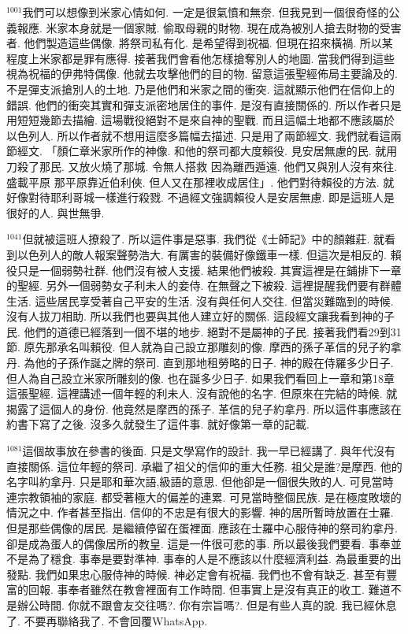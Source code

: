 \documentclass{book}
\begin{document}
$^{1001}$我們可以想像到米家心情如何.
一定是很氣憤和無奈.
但我見到一個很奇怪的公義報應.
米家本身就是一個家賊.
偷取母親的財物.
現在成為被別人搶去財物的受害者.
他們製造這些偶像.
將祭司私有化.
是希望得到祝福.
但現在招來橫禍.
所以某程度上米家都是罪有應得.
接著我們會看他怎樣搶奪別人的地圖.
當我們得到這些視為祝福的伊弗特偶像.
他就去攻擊他們的目的物.
留意這張聖經佈局主要論及的.
不是彈支派搶別人的土地.
乃是他們和米家之間的衝突.
這就顯示他們在信仰上的錯誤.
他們的衝突其實和彈支派密地居住的事件.
是沒有直接關係的.
所以作者只是用短短幾節去描繪.
這場戰役絕對不是來自神的聖戰.
而且這幅土地都不應該屬於以色列人.
所以作者就不想用這麼多篇幅去描述.
只是用了兩節經文.
我們就看這兩節經文.
「顏仁章米家所作的神像.
和他的祭司都大度賴役.
見安居無慮的民.
就用刀殺了那民.
又放火燒了那城.
令無人搭救 因為離西遁遠.
他們又與別人沒有來往.
盛載平原 那平原靠近伯利俠.
但人又在那裡收成居住」.
他們對待賴役的方法.
就好像對待耶利哥城一樣進行殺戮.
不過經文強調賴役人是安居無慮.
即是這班人是很好的人.
與世無爭.

$^{1041}$但就被這班人撩殺了.
所以這件事是惡事.
我們從《士師記》中的顏雜莊.
就看到以色列人的敵人報案聲勢浩大.
有厲害的裝備好像鐵車一樣.
但這次是相反的.
賴役只是一個弱勢社群.
他們沒有被人支援.
結果他們被殺.
其實這裡是在鋪排下一章的聖經.
另外一個弱勢女子利未人的妾侍.
在無聲之下被殺.
這裡提醒我們要有群體生活.
這些居民享受著自己平安的生活.
沒有與任何人交往.
但當災難臨到的時候.
沒有人拔刀相助.
所以我們也要與其他人建立好的關係.
這段經文讓我看到神的子民.
他們的道德已經落到一個不堪的地步.
絕對不是屬神的子民.
接著我們看29到31節.
原先那承名叫賴役.
但人就為自己設立那雕刻的像.
摩西的孫子革信的兒子約拿丹.
為他的子孫作誕之牌的祭司.
直到那地租勞略的日子.
神的殿在侍羅多少日子.
但人為自己設立米家所雕刻的像.
也在誕多少日子.
如果我們看回上一章和第18章這張聖經.
這裡講述一個年輕的利未人.
沒有說他的名字.
但原來在完結的時候.
就揭露了這個人的身份.
他竟然是摩西的孫子.
革信的兒子約拿丹.
所以這件事應該在約書下寫了之後.
沒多久就發生了這件事.
就好像第一章的記載.

$^{1081}$這個故事放在參書的後面.
只是文學寫作的設計.
我一早已經講了.
與年代沒有直接關係.
這位年輕的祭司.
承繼了祖父的信仰的重大任務.
祖父是誰?是摩西.
他的名字叫約拿丹.
只是耶和華次語,級語的意思.
但他卻是一個很失敗的人.
可見當時連宗教領袖的家庭.
都受著極大的偏差的連累.
可見當時整個民族.
是在極度敗壞的情況之中.
作者甚至指出.
信仰的不忠是有很大的影響.
神的居所暫時放置在士羅.
但是那些偶像的居民.
是繼續停留在蛋裡面.
應該在士羅中心服侍神的祭司約拿丹.
卻是成為蛋人的偶像居所的教皇.
這是一件很可悲的事.
所以最後我們要看.
事奉並不是為了穩食.
事奉是要對準神.
事奉的人是不應該以什麼經濟利益.
為最重要的出發點.
我們如果忠心服侍神的時候.
神必定會有祝福.
我們也不會有缺乏.
甚至有豐富的回報.
事奉者雖然在教會裡面有工作時間.
但事實上是沒有真正的收工.
難道不是辦公時間.
你就不跟會友交往嗎?.
你有宗旨嗎?.
但是有些人真的說.
我已經休息了.
不要再聯絡我了.
不會回覆WhatsApp.
\end{document}
